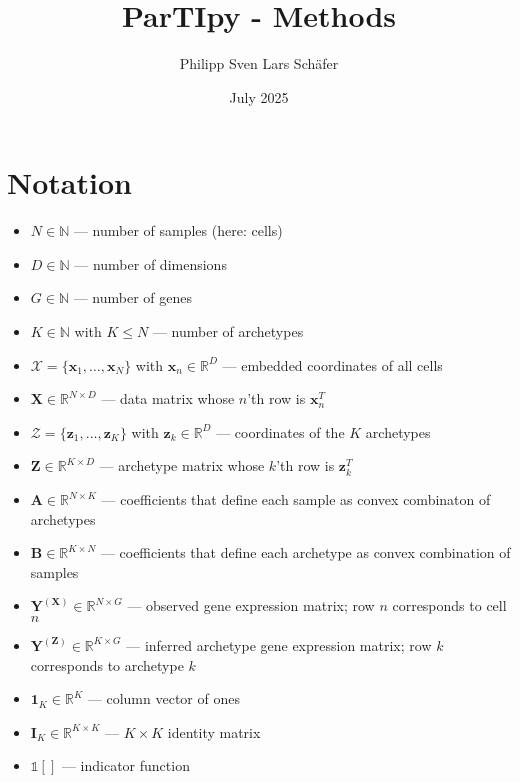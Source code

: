 \documentclass[oneside]{article}
\title{ParTIpy - Methods}
\author{Philipp Sven Lars Schäfer}
\date{July 2025}
\begin{document}
\maketitle

\tableofcontents
\clearpage

\section{Notation}\label{sec:notation}

\begin{itemize}
    \item $N \in \mathbb{N}$ — number of samples (here: cells)
    \item $D \in \mathbb{N}$ — number of dimensions
    \item $G \in \mathbb{N}$ — number of genes
    \item $K \in \mathbb{N}$ with $K \leq N$ — number of archetypes

    \item $\mathcal{X} = \{\mathbf{x}_1, \ldots, \mathbf{x}_N\}$ with $\mathbf{x}_n \in \mathbb{R}^D$ — embedded coordinates of all cells
    \item $\mathbf{X} \in \mathbb{R}^{N \times D}$ — data matrix whose $n$'th row is $\mathbf{x}_n^T$

    \item $\mathcal{Z} = \{\mathbf{z}_1, \ldots, \mathbf{z}_K\}$ with $\mathbf{z}_k \in \mathbb{R}^D$ — coordinates of the $K$ archetypes
    \item $\mathbf{Z} \in \mathbb{R}^{K \times D}$ — archetype matrix whose $k$'th row is $\mathbf{z}_k^T$

    \item $\mathbf{A} \in \mathbb{R}^{N \times K}$ — coefficients that define each sample as convex combinaton of archetypes
    \item $\mathbf{B} \in \mathbb{R}^{K \times N}$ — coefficients that define each archetype as convex combination of samples

    \item $\mathbf{Y}^{(\mathbf{X})} \in \mathbb{R}^{N \times G}$ — observed gene expression matrix; row $n$ corresponds to cell $n$
    \item $\mathbf{Y}^{(\mathbf{Z})} \in \mathbb{R}^{K \times G}$ — inferred archetype gene expression matrix; row $k$ corresponds to archetype $k$

    \item $\mathbf{1}_K \in \mathbb{R}^K$ — column vector of ones
    \item $\mathbf{I}_K \in \mathbb{R}^{K \times K}$ — $K \times K$ identity matrix
    \item $\mathds{1}[]$ — indicator function
\end{itemize}
\end{document}
